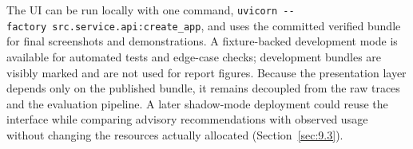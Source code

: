 The UI can be run locally with one command, \texttt{uvicorn\ -\/-factory\ src.service.api:create\_app}, and uses the committed verified bundle for final screenshots and demonstrations. A fixture-backed development mode is available for automated tests and edge-case checks; development bundles are visibly marked and are not used for report figures. Because the presentation layer depends only on the published bundle, it remains decoupled from the raw traces and the evaluation pipeline. A later shadow-mode deployment could reuse the interface while comparing advisory recommendations with observed usage without changing the resources actually allocated (Section~\ref{sec:9.3}).
